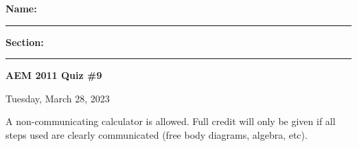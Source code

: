 \documentclass{article}
\begin{document}

\vspace{.5cm}
\noindent
\textbf{Name: }\rule{5cm}{0.4pt}\hspace{.5cm}
\textbf{Section: }\rule{1cm}{0.4pt}
\hfill\textbf{AEM 2011 Quiz \#9}

\noindent
\hfill Tuesday, March 28, 2023
\vspace{1cm}
\noindent

\vspace{.3cm}

\noindent A non-communicating calculator is allowed.  Full credit will only be given if all steps used are clearly communicated (free body diagrams, algebra, etc).

\vspace{0.5cm}









\end{document}
